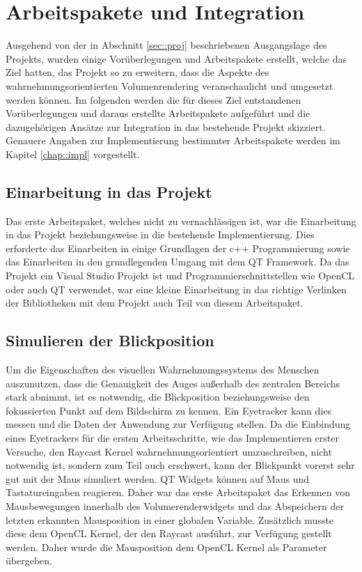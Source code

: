 \section{Arbeitspakete und Integration}\label{sec::workpacks}
Ausgehend von der in Abschnitt \ref{sec::proj} beschriebenen Ausgangslage des Projekts, wurden einige Vorüberlegungen und Arbeitspakete erstellt, welche das Ziel hatten, das Projekt so zu erweitern, dass die Aspekte des wahrnehmungsorientierten Volumenrendering veranschaulicht und umgesetzt werden können.
Im folgenden werden die für dieses Ziel entstandenen Vorüberlegungen und daraus erstellte Arbeitspakete aufgeführt und die dazugehörigen Ansätze zur Integration in das bestehende Projekt skizziert.
Genauere Angaben zur Implementierung bestimmter Arbeitspakete werden im Kapitel \ref{chap::impl} vorgestellt.

\subsection{Einarbeitung in das Projekt}
Das erste Arbeitspaket, welches nicht zu vernachlässigen ist, war die Einarbeitung in das Projekt beziehungsweise in die bestehende Implementierung.
Dies erforderte das Einarbeiten in einige Grundlagen der c++ Programmierung sowie das Einarbeiten in den grundlegenden Umgang mit dem QT Framework.
Da das Projekt ein Visual Studio Projekt ist und Programmierschnittstellen wie OpenCL oder auch QT verwendet, war eine kleine Einarbeitung in das richtige Verlinken der Bibliotheken mit dem Projekt auch Teil von diesem Arbeitspaket.

\subsection{Simulieren der Blickposition}
Um die Eigenschaften des visuellen Wahrnehmungssystems des Menschen auszunutzen, dass die Genauigkeit des Auges außerhalb des zentralen Bereichs stark abnimmt, ist es notwendig, die Blickposition beziehungsweise den fokussierten Punkt auf dem Bildschirm zu kennen.
Ein Eyetracker kann dies messen und die Daten der Anwendung zur Verfügung stellen.
Da die Einbindung eines Eyetrackers für die ersten Arbeitsschritte, wie das Implementieren erster Versuche, den Raycast Kernel wahrnehmungsorientiert umzuschreiben, nicht notwendig ist, sondern zum Teil auch erschwert, kann der Blickpunkt vorerst sehr gut mit der Maus simuliert werden.
QT Widgets können auf Maus und Tastatureingaben reagieren.
Daher war das erste Arbeitspaket das Erkennen von Mausbewegungen innerhalb des Volumerenderwidgets und das Abspeichern der letzten erkannten Mausposition in einer globalen Variable.
Zusätzlich musste diese dem OpenCL Kernel, der den Raycast ausführt, zur Verfügung gestellt werden.
Daher wurde die Mausposition dem OpenCL Kernel als Parameter übergeben.

